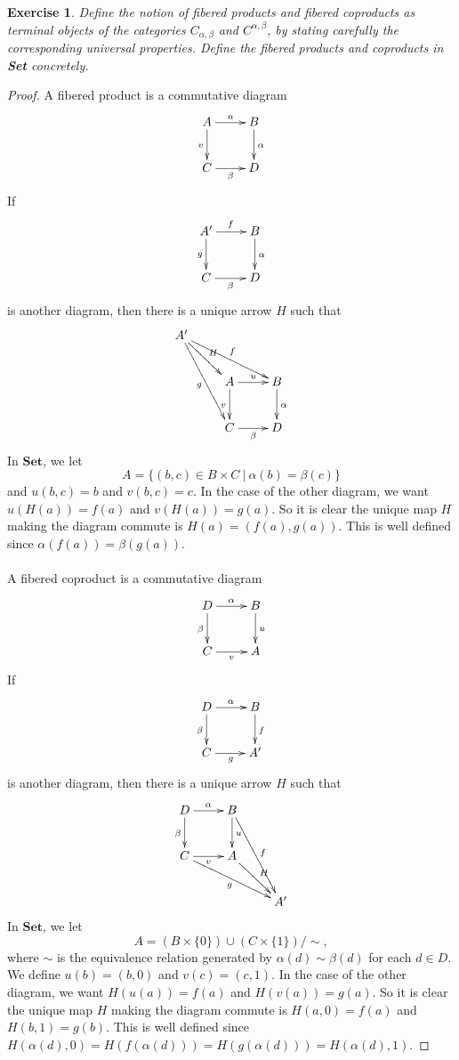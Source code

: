 \documentclass[a4paper, 11pt]{book}
\theoremstyle{plain}
\newtheorem{exercise}[theorem]{Exercise}
\theoremstyle{plain}
\begin{document}
\begin{exercise}
Define the notion of fibered products and fibered coproducts as terminal objects of the categories $C_{\alpha,\beta}$ and $C^{\alpha,\beta}$, by stating carefully the corresponding universal properties. Define the fibered products and coproducts in \textbf{Set} concretely.
\end{exercise}
\begin{proof}
A fibered product is a commutative diagram
$$\xymatrix{
A\ar[d]_v\ar[r]^u & B\ar[d]^\alpha\\
C\ar[r]_\beta & D
}$$
If
$$\xymatrix{
A'\ar[d]_g\ar[r]^f & B\ar[d]^\alpha\\
C\ar[r]_\beta & D
}$$
is another diagram, then there is a unique arrow $H$ such that 
$$\xymatrix{
A'\ar[dr]^H\ar[drr]^f\ar[ddr]_g & & \\
& A\ar[d]_v\ar[r]^u & B\ar[d]^\alpha\\
& C\ar[r]_\beta & D
}$$
In $\textbf{Set}$, we let
$$A = \{(b,c)\in B\times C~\vert~\alpha(b)=\beta(c)\}$$
and $u(b,c) = b$ and $v(b,c) = c$. In the case of the other diagram, we want $u(H(a)) = f(a)$ and $v(H(a)) = g(a)$. So it is clear the unique map $H$ making the diagram commute is $H(a) = (f(a), g(a))$. This is well defined since $\alpha(f(a)) = \beta(g(a))$.\\\\

A fibered coproduct is a commutative diagram
$$\xymatrix{
D\ar[d]_\beta\ar[r]^\alpha & B\ar[d]^u\\
C\ar[r]_v & A
}$$
If
$$\xymatrix{
D\ar[d]_\beta\ar[r]^\alpha & B\ar[d]^f\\
C\ar[r]_g & A'
}$$
is another diagram, then there is a unique arrow $H$ such that 
$$\xymatrix{
D\ar[d]_\beta\ar[r]^\alpha & B\ar[d]^u\ar[ddr]^f & \\
C\ar[r]_v\ar[rrd]_g & A\ar[rd]^H & \\
& & A'
}$$
In $\textbf{Set}$, we let
$$A = (B\times \{0\})\cup (C\times \{1\})/\sim,$$
where $\sim$ is the equivalence relation generated by $\alpha(d)\sim \beta(d)$ for each $d\in D$. We define $u(b) = (b,0)$ and $v(c) = (c,1)$. In the case of the other diagram, we want $H(u(a)) = f(a)$ and $H(v(a)) = g(a)$. So it is clear the unique map $H$ making the diagram commute is $H(a,0) = f(a)$ and $H(b,1)=g(b)$. This is well defined since $H(\alpha(d),0) = H(f(\alpha(d))) = H(g(\alpha(d))) = H(\alpha(d),1)$.
\end{proof}
\end{document}
